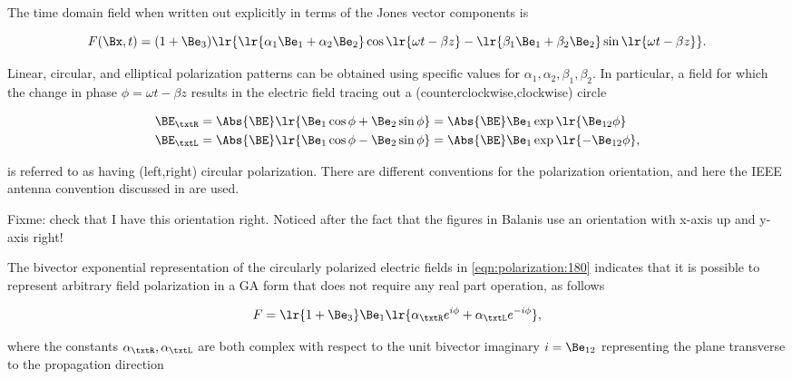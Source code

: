 The time domain field when written out explicitly in terms of the Jones vector components is

\begin{dmath}\label{eqn:polarization:160}
F(\Bx, t) = (1 + \Be_3) \lr{
\lr{ \alpha_1 \Be_1 + \alpha_2 \Be_2 } \cos\lr{ \omega t - \beta z }
-\lr{ \beta_1 \Be_1 + \beta_2 \Be_2 } \sin\lr{ \omega t - \beta z }
}.
\end{dmath}

Linear, circular, and elliptical polarization patterns can be obtained using specific values for \( \alpha_1, \alpha_2, \beta_1, \beta_2 \).
In particular,
a field for which the
change in phase \( \phi = \omega t - \beta z \) results in the electric field tracing out a (counterclockwise,clockwise) circle

\begin{dmath}\label{eqn:polarization:180}
\begin{aligned}
\BE_\txtR &= \Abs{\BE} \lr{ \Be_1 \cos\phi + \Be_2 \sin\phi } = \Abs{\BE} \Be_1 \exp\lr{  \Be_{12} \phi } \\
\BE_\txtL &= \Abs{\BE} \lr{ \Be_1 \cos\phi - \Be_2 \sin\phi } = \Abs{\BE} \Be_1 \exp\lr{ -\Be_{12} \phi },
\end{aligned}
\end{dmath}

is referred to as having
(left,right) circular polarization.
There are different conventions for the polarization orientation, and here the IEEE antenna convention discussed in \citep{balanis1989advanced} are used.

Fixme: check that I have this orientation right.  Noticed after the fact that the figures in Balanis use an orientation with x-axis up and y-axis right!

The bivector exponential representation of the circularly polarized electric fields in \cref{eqn:polarization:180} indicates that it is possible to represent arbitrary field polarization in a GA form that does not require any real part operation, as follows

\begin{dmath}\label{eqn:polarization:200}
F = \lr{ 1 + \Be_3 } \Be_1 \lr{ \alpha_\txtR e^{i\phi} + \alpha_\txtL e^{-i\phi} },
\end{dmath}

where the constants \( \alpha_\txtR, \alpha_\txtL \) are both complex with respect to the unit bivector imaginary \( i = \Be_{12} \) representing the plane transverse to the propagation direction

